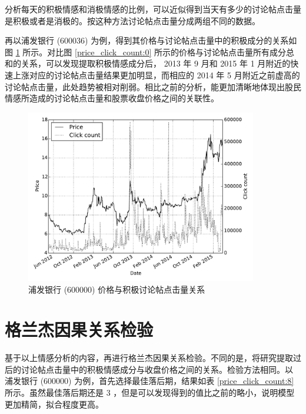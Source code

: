 分析每天的积极情感和消极情感的比例，可以近似得到当天有多少的讨论帖点击量是积极或者是消极的。按这种方法讨论帖点击量分成两组不同的数据。

再以浦发银行 (600036) 为例，得到其价格与讨论帖点击量中的积极成分的关系如图 \ref{price_click_count:7} 所示。对比图 \ref{price_click_count:0} 所示的价格与讨论帖点击量所有成分总和的关系，可以发现提取积极情感成分后， 2013 年 9 月和 2015 年 1 月附近的快速上涨对应的讨论帖点击量结果更加明显，而相应的 2014 年 5 月附近之前虚高的讨论帖点击量，此处趋势被相对削弱。相比之前的分析，能更加清晰地体现出股民情感所造成的讨论帖点击量和股票收盘价格之间的关联性。

\begin{figure}
  \centering
  \includegraphics[width=0.9\textwidth]{plots/price_click_count_positive_line.pdf}
  \caption{浦发银行 (600000) 价格与积极讨论帖点击量关系}
  \label{price_click_count:7}
\end{figure}

\section{格兰杰因果关系检验}

基于以上情感分析的内容，再进行格兰杰因果关系检验。不同的是，将研究提取过后的讨论帖点击量中的积极情感成分与收盘价格之间的关系。检验方法相同。以 浦发银行 (600000) 为例，首先选择最佳落后期，结果如表 \ref{price_click_count:8} 所示。虽然最佳落后期还是 $3$ ，但是可以发现得到的值比之前的略小，说明模型更加精简，拟合程度更高。

